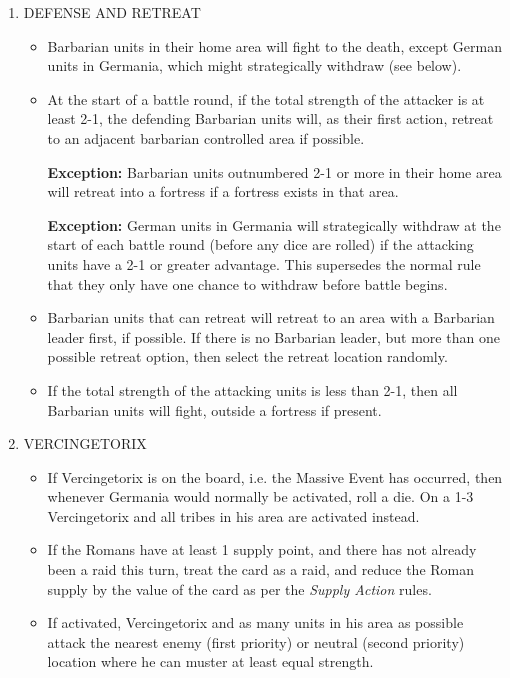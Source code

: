 \begin{enumerate}
  \item DEFENSE AND RETREAT
  \begin{itemize}
    \item Barbarian units in their home area will fight to the death, except German units in Germania, which might strategically withdraw (see below).
    \item At the start of a battle round, if the total strength of the attacker is at least 2-1, the defending Barbarian units will, as their first action, retreat to an adjacent barbarian controlled area if possible.
    
    \textbf{Exception:} Barbarian units outnumbered 2-1 or more in their home area will retreat into a fortress if a fortress exists in that area.
    
    \textbf{Exception:} German units in Germania will strategically withdraw at the start of each battle round (before any dice are rolled) if the attacking units have a 2-1 or greater advantage. This supersedes the normal rule that they only have one chance to withdraw before battle begins.
    \item Barbarian units that can retreat will retreat to an area with a Barbarian leader first, if possible. If there is no Barbarian leader, but more than one possible retreat option, then select the retreat location randomly.
    \item If the total strength of the attacking units is less than 2-1, then all Barbarian units will fight, outside a fortress if present.
  \end{itemize}
  
  \item VERCINGETORIX
  \begin{itemize}
    \item If Vercingetorix is on the board, i.e. the Massive Event has occurred, then whenever Germania would normally be activated, roll a die. On a 1-3 Vercingetorix and all tribes in his area are activated instead.
    
    \item If the Romans have at least 1 supply point, and there has not already been a raid this turn, treat the card as a raid, and reduce the Roman supply by the value of the card as per the \textit{Supply Action} rules.
    
    \item If activated, Vercingetorix and as many units in his area as possible attack the nearest enemy (first priority) or neutral (second priority) location where he can muster at least equal strength.
    

\end{itemize}
\end{enumerate}
